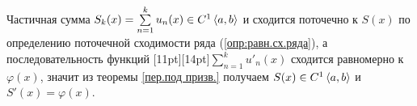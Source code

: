 \begin{prf} %
	Частичная сумма $S_k(x) = \sum\limits_{n = 1}^{k}u_n(x) \in C^1\left<a, b\right>$ и сходится поточечно к $S(x)$ по определению поточечной сходимости ряда (\ref{опр:равн.сх.ряда}), а последовательность функций \raisebox{0pt}[11pt][14pt]{$\sum\limits_{n = 1}^{k} u'_n(x)$} сходится равномерно к $\varphi(x)$, значит из теоремы \ref{пер.под призв.} получаем $S(x) \in C^1\left<a, b\right>$ и $S'(x) = \varphi(x)$. 
\end{prf} %